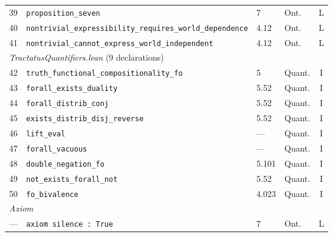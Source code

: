 \documentclass[10pt, letterpaper]{article}
\theoremstyle{definition}
\theoremstyle{remark}
\begin{document}
\begin{table}[p]
\begin{tabular}{@{}rlllc@{}}
39 & \texttt{proposition\_seven}                         & 7       & Ont. & L \\
40 & \texttt{nontrivial\_expressibility\_requires\_world\_dependence}
                                                         & 4.12    & Ont. & L \\
41 & \texttt{nontrivial\_cannot\_express\_world\_independent}
                                                         & 4.12    & Ont. & L \\
\midrule
\multicolumn{5}{l}{\emph{TractatusQuantifiers.lean} (9 declarations)} \\
\midrule
42 & \texttt{truth\_functional\_compositionality\_fo}    & 5       & Quant. & I \\
43 & \texttt{forall\_exists\_duality}                    & 5.52    & Quant. & I \\
44 & \texttt{forall\_distrib\_conj}                      & 5.52    & Quant. & I \\
45 & \texttt{exists\_distrib\_disj\_reverse}             & 5.52    & Quant. & I \\
46 & \texttt{lift\_eval}                                 & ---     & Quant. & I \\
47 & \texttt{forall\_vacuous}                            & ---     & Quant. & I \\
48 & \texttt{double\_negation\_fo}                       & 5.101   & Quant. & I \\
49 & \texttt{not\_exists\_forall\_not}                   & 5.52    & Quant. & I \\
50 & \texttt{fo\_bivalence}                              & 4.023   & Quant. & I \\
\midrule
\multicolumn{5}{l}{\emph{Axiom}} \\
\midrule
--- & \texttt{axiom silence : True}                      & 7       & Ont. & L \\
\bottomrule
\end{tabular}
\end{table}

\end{document}
